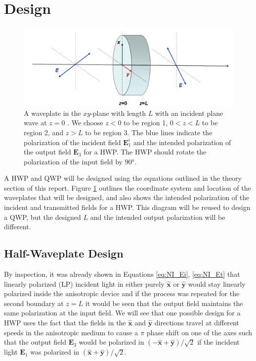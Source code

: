 \documentclass{optica-article}
\newcommand{\bv}[1]{\mathbf{#1}}
\begin{document}
\section{Design}
\begin{figure}[h]
  \centering
  \includegraphics[width=\textwidth]{figs/HWP.PNG}
  \caption{
      A waveplate in the $xy$-plane with length $L$ with an incident
      plane wave at $z=0$ \cite{Wav_anis}. We choose $z<0$ to be region 
      1, $0<z<L$ to be region 2, and $z>L$ to be region 3. The blue lines 
      indicate the polarization of the incident field $\bv{E}_1^i$ and the
      intended polarization of the output field $\bv{E}_3$ for a HWP. The HWP
      should rotate the polarization of the input field by $\ang{90}$.
  }
  \label{fig:HWP}
\end{figure}
A HWP and QWP will be designed using the equations outlined in the theory
section of this report. Figure \ref{fig:HWP} outlines the coordinate system
and location of the waveplates that will be designed, and also shows the
intended polarization of the incident and transmitted fields for a HWP. This
diagram will be reused to design a QWP, but the designed $L$ and the intended
output polarization will be different.


\subsection{Half-Waveplate Design}
By inspection, it was already shown in Equations \eqref{eq:NI_Ei}, 
\eqref{eq:NI_Et} that linearly polarized (LP) incident light in either 
purely $\bv{\hat{x}}$ or $\bv{\hat{y}}$ would stay linearly polarized inside
the anisotropic device and if the process was repeated for the second boundary
at $z=L$ it would be seen that the output field maintains the same polarization
at the input field. We will see that one possible design for a HWP uses the 
fact that the fields in the $\bv{\hat{x}}$ and $\bv{\hat{y}}$ directions travel
at different speeds in the anisotropic medium to cause a $\pi$ phase shift on
one of the axes such that the output field $\bv{E}_3$ would be polarized in 
$(-\bv{\hat{x}} + \bv{\hat{y}})/\sqrt{2}$ if the incident light $\bv{E}_{1}$ was
polarized in $(\bv{\hat{x}} + \bv{\hat{y}})/\sqrt{2}$.
\end{document}
